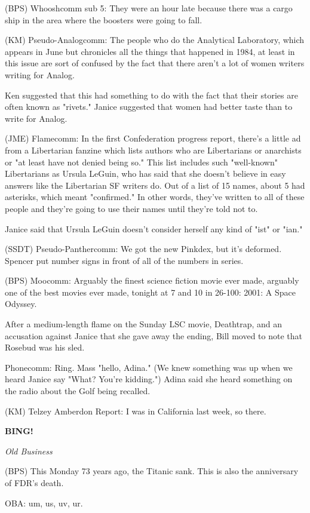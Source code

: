 \documentclass[12pt]{article}
\newcommand{\bing}{{\bf BING!} }
\newcommand{\goto}[1]{\bing \vskip 12pt \centerline{{\em{#1}}}}
\begin{document}
(BPS) Whooshcomm sub 5: They were an hour late because there was a cargo ship in the area where the boosters were going to fall.

(KM) Pseudo-Analogcomm: The people who do the Analytical Laboratory, which appears in June but chronicles all the things that happened in 1984, at least in this issue are sort of confused by the fact that there aren't a lot of women writers writing for Analog.

Ken suggested that this had something to do with the fact that their stories are often known as "rivets." Janice suggested that women had better taste than to write for Analog.

(JME) Flamecomm: In the first Confederation progress report, there's a little ad from a Libertarian fanzine which lists authors who are Libertarians or anarchists or "at least have not denied being so." This list includes such "well-known" Libertarians as Ursula LeGuin, who has said that she doesn't believe in easy answers like the Libertarian SF writers do. Out of a list of 15 names, about 5 had asterisks, which meant "confirmed." In other words, they've written to all of these people and they're going to use their names until they're told not to.

Janice said that Ursula LeGuin doesn't consider herself any kind of "ist" or "ian."

(SSDT) Pseudo-Panthercomm: We got the new Pinkdex, but it's deformed. Spencer put number signs in front of all of the numbers in series.

(BPS) Moocomm: Arguably the finest science fiction movie ever made, arguably one of the best movies ever made, tonight at 7 and 10 in 26-100: 2001: A Space Odyssey.

After a medium-length flame on the Sunday LSC movie, Deathtrap, and an accusation against Janice that she gave away the ending, Bill moved to note that Rosebud was his sled.

Phonecomm: Ring. Mass "hello, Adina." (We knew something was up when we heard Janice say "What? You're kidding.") Adina said she heard something on the radio about the Golf being recalled.

(KM) Telzey Amberdon Report: I was in California last week, so there.

\goto{Old Business}

(BPS) This Monday 73 years ago, the Titanic sank. This is also the anniversary of FDR's death.

OBA: um, us, uv, ur.
\end{document}

